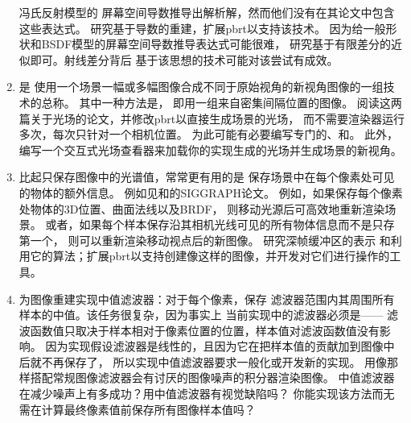 \begin{enumerate}
            冯氏反射模型的
            屏幕空间导数推导出解析解，然而他们没有在其论文中包含这些表达式。
            研究基于导数的重建，扩展pbrt以支持该技术。
            因为给一般形状和BSDF模型的屏幕空间导数推导表达式可能很难，
            研究基于有限差分的近似即可。射线差分背后
            基于该思想的技术可能对该尝试有成效。
      \item \circlethree {}是
            使用一个场景一幅或多幅图像合成不同于原始视角的新视角图像的一组技术的总称。
            其中一种方法是，
            即用一组来自密集间隔位置的图像\citep{10.1145/237170.237199,10.1145/237170.237200}。
            阅读这两篇关于光场的论文，并修改pbrt以直接生成场景的光场，
            而不需要渲染器运行多次，每次只针对一个相机位置。
            为此可能有必要编写专门的、和。
            此外，编写一个交互式光场查看器来加载你的实现生成的光场并生成场景的新视角。
      \item \circlethree 比起只保存图像中的光谱值，常常更有用的是
            保存场景中在每个像素处可见的物体的额外信息。
            例如见\citet{10.1145/325334.325247}和\citet{10.1145/97879.97901}的SIGGRAPH论文。
            例如，如果保存每个像素处物体的3D位置、曲面法线以及BRDF，
            则移动光源后可高效地重新渲染场景\citep{10.1145/344779.344938}。
            或者，如果每个样本保存沿其相机光线可见的所有物体信息而不是只存第一个，
            则可以重新渲染移动视点后的新图像\citep{10.1145/280814.280882}。
            研究深帧缓冲区的表示
            和利用它的算法；扩展pbrt以支持创建像这样的图像，并开发对它们进行操作的工具。
      \item \circletwo 为图像重建实现中值滤波器：对于每个像素，保存
            滤波器范围内其周围所有样本的中值。该任务很复杂，因为事实上
            当前实现中的滤波器必须是——
            滤波函数值只取决于样本相对于像素位置的位置，样本值对滤波函数值没有影响。
            因为实现假设滤波器是线性的，且因为它在把样本值的贡献加到图像中后就不再保存了，
            所以实现中值滤波器要求一般化或开发新的实现。
            用像那样搭配常规图像滤波器会有讨厌的图像噪声的积分器渲染图像。
            中值滤波器在减少噪声上有多成功？用中值滤波器有视觉缺陷吗？
            你能实现该方法而无需在计算最终像素值前保存所有图像样本值吗？

\end{enumerate}
